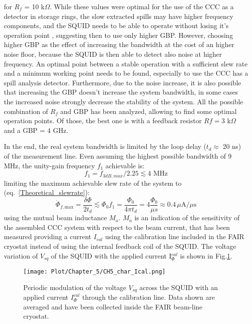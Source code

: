 \documentclass[12pt,a4paper]{report}
\begin{document}
        for $R_f$ = 10 k$\Omega$. While these values were optimal for the use of the CCC as a detector in storage rings, the slow extracted spills may have higher frequency components, and the SQUID needs to be able to operate without losing it's operation point \cite{Drung2009}, suggesting then to use only higher GBP. However, choosing higher GBP as the effect of increasing the bandwidth at the cost of an higher noise floor, because the SQUID is then able to detect also noise at higher frequency. An optimal point between a stable operation with a sufficient slew rate and a minimum working point needs to be found, especially to use the CCC has a spill analysis detector. Furthermore, due to the noise increase, it is also possible that increasing the GBP doesn't increase the system bandwidth, in some cases the increased noise strongly decrease the stability of the system. All the possible combination of $R_f$ and GBP has been analyzed, allowing to find some optimal operation points. Of those, the best one is with a feedback resistor $Rf = 3$ k$\Omega$ and a GBP = 4 GHz. 
        
        In the end, the real system bandwidth is limited by the loop delay ($t_d \approx$ 20 ns) of the measurement line.  Even assuming the highest possible bandwidth of 9 MHz, the unity-gain frequency $f_1$ achievable is:
        \begin{equation}
        	f_1 = f_{3dB,max} / 2.25 \lesssim 4 \text{ MHz}
        \end{equation}
        limiting the maximum achievable slew rate of the system to \cite{Squid_handbook_1} (eq.~\ref{Theoretical_slewrate}):
        \begin{equation}
        	\dot{\Phi}_{f,\text{max}} = \frac{\delta \Phi}{2 t_d} \lesssim \Phi_0 f_1 = \frac{\Phi_0}{4 \pi t_d} = 4 \frac{\Phi_0}{\mu s} \approx 0.4 \, \mu \text{A}/ \mu \text{s}
        \end{equation}
        using the mutual beam inductance $M_a$. $M_a$ is an indication of the sensitivity of the assembled CCC system with respect to the beam current, that has been measured providing a current $I_{cal}$ using the calibration line included in the FAIR cryostat instead of using the internal feedback coil of the SQUID. The voltage variation of $V_{sq}$ of the SQUID with the applied current I$_\Phi^{cal}$ is shown in Fig.\ref{CH5_char_Ical}.
        \begin{figure}[H]
        	\centering
        	\texttt{[image: Plot/Chapter\_5/CH5\_char\_Ical.png]}
        	\caption{\small{Periodic modulation of the voltage $V_{sq}$ across the SQUID with an applied current $I_\Phi^{cal}$ through the calibration line. Data shown are averaged and have been collected inside the FAIR beam-line cryostat.}}
        	\label{CH5_char_Ical}
        \end{figure}
        
\end{document}
